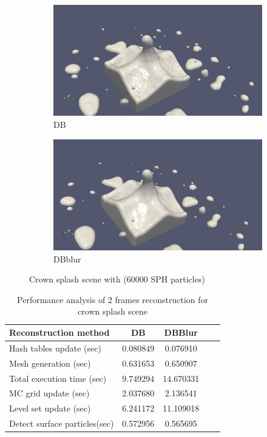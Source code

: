 \begin{figure}
	\begin{center}
       \begin{subfigure}[b]{\textwidth}
               \includegraphics[width=\textwidth]{figures/CrownOriginal2.png}
				\caption{DB}
        \end{subfigure}
        \begin{subfigure}[b]{\textwidth}
               \includegraphics[width=\textwidth]{figures/CrownBlurred2.png}
				\caption{DBblur}
        \end{subfigure}
        \caption{Crown splash scene with (60000 SPH particles)}
        \label{fig:CrownScene2}
	\end{center}
\end{figure}
\begin{table}[H]
	\begin{center}
		\scriptsize
		\begin{tabular}{|l|c|c|c|c|}
			\hline
			Reconstruction method & DB & DBBlur\\
			\hline
			Hash tables update (sec)		&	0.080849	&	0.076910	\\
			Mesh generation	(sec)			&	0.631653	&	0.650907	\\
			Total execution time (sec)		&	9.749294	&	14.670331	\\
			MC grid update (sec)			&	2.037680	&	2.136541	\\
			Level set update (sec)			&	6.241172	&	11.109018	\\
			Detect surface particles(sec)	&	0.572956	&	0.565695	\\
			\hline
		\end{tabular}
	\end{center}
	\caption{Performance analysis of 2 frames reconstruction for crown splash scene}
	\label{tab:CrownScene}
\end{table}




